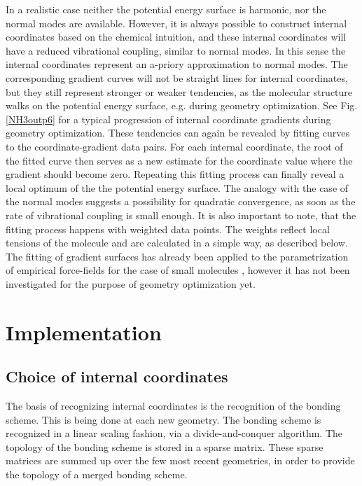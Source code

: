 \documentclass[prl,twocolumn,showpacs,twocolumngrid,superbib]{revtex4}
\begin{document}
In a realistic case neither the potential energy surface is 
harmonic, nor the normal modes are available. However, it is always
possible to construct internal coordinates based on the chemical
intuition, and these internal coordinates will have a reduced
vibrational coupling, similar to normal modes. 
In this sense the internal coordinates represent an a-priory
approximation to normal modes.
The corresponding
gradient curves will not be straight lines for internal coordinates,
but they still represent stronger or weaker tendencies, as the molecular
structure walks on the potential energy surface, e.g. during geometry
optimization. 
See Fig. \ref{NH3outp6} for a typical progression of internal
coordinate gradients during geometry optimization.
These tendencies can again be revealed by fitting curves to the
coordinate-gradient data pairs. For each internal coordinate,
the root of the fitted curve then 
serves as a new estimate for the coordinate value where the gradient
should become zero. Repeating this fitting process can finally
reveal a local optimum of the the potential energy surface.
The analogy with the case of the normal modes suggests a possibility
for quadratic convergence, as soon as the rate of vibrational
coupling is small enough.
It is also important to note, that the fitting process happens
with weighted data points. The weights reflect local tensions
of the molecule and are calculated in a simple way, as described below.
The fitting of gradient surfaces has already been applied to 
the parametrization of empirical
force-fields for the case of small molecules
\cite{force-field-fitting,force-matching}, however it 
has not been investigated for the purpose of geometry optimization yet.

\section{Implementation}
\subsection{Choice of internal coordinates}
The basis of recognizing internal coordinates is the recognition
of the bonding scheme. This is being done at each new geometry.
The bonding scheme is recognized in a linear scaling fashion, via
a divide-and-conquer algorithm. The topology of the bonding scheme
is stored in a sparse matrix. These sparse matrices are summed
up over the few most recent geometries, in order to provide
the topology of a merged bonding scheme.
\end{document}
